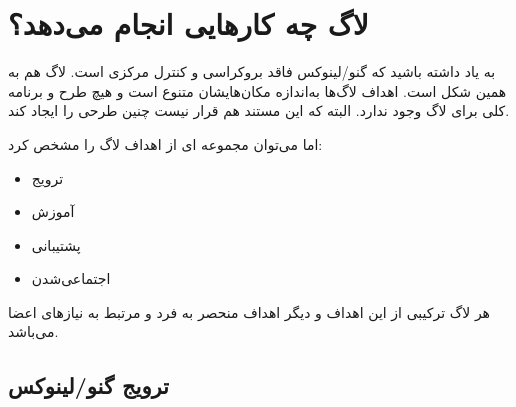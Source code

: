 \section{لاگ چه کارهایی انجام می‌دهد؟}

به یاد داشته باشید که گنو/لینوکس فاقد بروکراسی و کنترل مرکزی است.
لاگ هم به همین شکل است. اهداف لاگ‌ها به‌اندازه مکان‌هایشان متنوع است
و هیچ طرح و برنامه کلی برای لاگ وجود ندارد. البته که این مستند هم
قرار نیست چنین طرحی را ایجاد کند.

اما می‌توان مجموعه ای از اهداف لاگ را مشخص کرد:

\begin{itemize}
\item ترویج 
\item آموزش 
\item پشتیبانی 
\item اجتماعی‌شدن 
\end{itemize}

هر لاگ ترکیبی از این اهداف و دیگر اهداف منحصر به فرد و مرتبط
به نیاز‌های اعضا می‌باشد.

\subsection{ترویج گنو/لینوکس }


